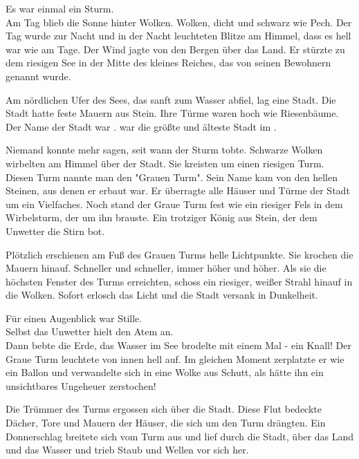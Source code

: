 





\begin{huge}
\begin{itshape}
Es war einmal ein Sturm.\\
Am Tag blieb die Sonne hinter Wolken. Wolken, dicht und schwarz wie Pech. Der Tag wurde zur Nacht und in der Nacht leuchteten Blitze am Himmel, dass es hell war wie am Tage. Der Wind jagte von den Bergen über das Land. Er stürzte zu dem riesigen See in der Mitte des kleines Reiches, das von seinen Bewohnern {\Enland} genannt wurde.

Am nördlichen Ufer des Sees, das sanft zum Wasser abfiel, lag eine Stadt. Die Stadt hatte feste Mauern aus Stein. Ihre Türme waren hoch wie Riesenbäume. Der Name der Stadt war {\Tern}. {\Tern} war die größte und älteste Stadt im {\Enland}. 

Niemand konnte mehr sagen, seit wann der Sturm tobte. Schwarze Wolken wirbelten am Himmel über der Stadt. Sie kreisten um einen riesigen Turm. Diesen Turm nannte man den "Grauen Turm". Sein Name kam von den hellen Steinen, aus denen er erbaut war. Er überragte alle Häuser und Türme der Stadt um ein Vielfaches. Noch stand der Graue Turm fest wie ein riesiger Fels in dem Wirbelsturm, der um ihn brauste. Ein trotziger König aus Stein, der dem Unwetter die Stirn bot.

Plötzlich erschienen am Fuß des Grauen Turms helle Lichtpunkte. Sie krochen die Mauern hinauf. Schneller und schneller, immer höher und höher. Als sie die höchsten Fenster des Turms erreichten, schoss ein riesiger, weißer Strahl hinauf in die Wolken. Sofort erlosch das Licht und die Stadt versank in Dunkelheit.

Für einen Augenblick war Stille.\\
Selbst das Unwetter hielt den Atem an.\\
Dann bebte die Erde, das Wasser im See brodelte mit einem Mal - ein Knall! Der Graue Turm leuchtete von innen hell auf. Im gleichen Moment zerplatzte er wie ein Ballon und verwandelte sich in eine Wolke aus Schutt, als hätte ihn ein unsichtbares Ungeheuer zerstochen! 

Die Trümmer des Turms ergossen sich über die Stadt. Diese Flut bedeckte Dächer, Tore und Mauern der Häuser, die sich um den Turm drängten. Ein Donnerschlag breitete sich vom Turm aus und lief durch die Stadt, über das Land und das Wasser und trieb Staub und Wellen vor sich her.


\end{itshape}
\end{huge}
